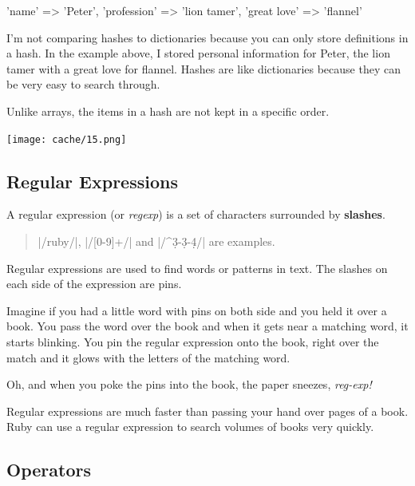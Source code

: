 \documentclass[12pt,twoside]{report}
\begin{document}
\begin{rubycode}

 {
   'name' => 'Peter',
   'profession' => 'lion tamer',
   'great love' => 'flannel'
 }

\end{rubycode}


I'm not comparing hashes to dictionaries because you can only store
definitions in a hash.  In the example above, I stored personal
information for Peter, the lion tamer with a great love for flannel.
Hashes are like dictionaries because they can be very easy to search
through.

Unlike arrays, the items in a hash are not kept in a specific order.

	\texttt{[image: cache/15.png]}




\subsection{Regular Expressions}



A regular expression (or {\em regexp}) is a set of characters
surrounded by {\bf slashes}.

\begin{quote}
\rubyinline|/ruby/|,
\rubyinline|/[0-9]+/| and
\rubyinline|/^\d{3}-\d{3}-\d{4}/| are
examples.\end{quote}


Regular expressions are used to find words or patterns in text.  The
slashes on each side of the expression are pins.

Imagine if you had a little word with pins on both side and you held
it over a book.  You pass the word over the book and when it gets near
a matching word, it starts blinking.  You pin the regular expression
onto the book, right over the match and it glows with the letters of
the matching word.

Oh, and when you poke the pins into the book, the paper sneezes, {\em
  reg-exp!}

Regular expressions are much faster than passing your hand over pages
of a book.  Ruby can use a regular expression to search volumes of
books very quickly.



\subsection{Operators}
\end{document}
